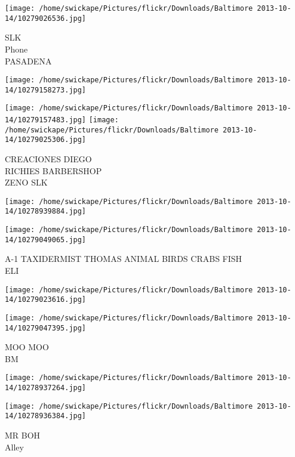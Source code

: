 \documentclass[10pt,letterpaper]{article}
\begin{document}
\texttt{[image: /home/swickape/Pictures/flickr/Downloads/Baltimore 2013-10-14/10279026536.jpg]}

SLK\\
Phone\\
PASADENA\\
\pagebreak

\texttt{[image: /home/swickape/Pictures/flickr/Downloads/Baltimore 2013-10-14/10279158273.jpg]}

\vspace{0.25in}
\texttt{[image: /home/swickape/Pictures/flickr/Downloads/Baltimore 2013-10-14/10279157483.jpg]}
\texttt{[image: /home/swickape/Pictures/flickr/Downloads/Baltimore 2013-10-14/10279025306.jpg]}

CREACIONES DIEGO\\
RICHIES BARBERSHOP\\
ZENO SLK\\
\pagebreak

\texttt{[image: /home/swickape/Pictures/flickr/Downloads/Baltimore 2013-10-14/10278939884.jpg]}

\vspace{0.25in}
\texttt{[image: /home/swickape/Pictures/flickr/Downloads/Baltimore 2013-10-14/10279049065.jpg]}

A{-}1 TAXIDERMIST THOMAS ANIMAL BIRDS CRABS FISH\\
ELI\\
\pagebreak

\texttt{[image: /home/swickape/Pictures/flickr/Downloads/Baltimore 2013-10-14/10279023616.jpg]}

\vspace{0.25in}
\texttt{[image: /home/swickape/Pictures/flickr/Downloads/Baltimore 2013-10-14/10279047395.jpg]}

MOO MOO\\
BM\\
\pagebreak

\texttt{[image: /home/swickape/Pictures/flickr/Downloads/Baltimore 2013-10-14/10278937264.jpg]}

\vspace{0.25in}
\texttt{[image: /home/swickape/Pictures/flickr/Downloads/Baltimore 2013-10-14/10278936384.jpg]}

MR BOH\\
Alley\\
\pagebreak
\end{document}

